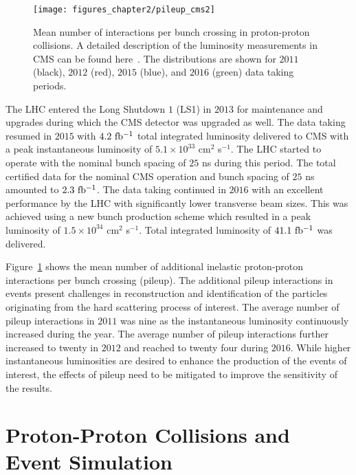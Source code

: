 \begin{figure}[h]
\centering
\texttt{[image: figures\_chapter2/pileup\_cms2]}
\caption{Mean number of interactions per bunch crossing in proton-proton collisions. A detailed description of the  luminosity measurements in CMS can be found here~\cite{CMS-PAS-LUM-13-001,CMS-PAS-LUM-15-001}. The distributions are shown for $2011$ (black), $2012$ (red), $2015$ (blue), and $2016$ (green) data taking periods.}
\label{fig:pu}
\end{figure} 

The LHC entered the Long Shutdown $1$ (LS1) in $2013$ for maintenance and upgrades during which the CMS detector was upgraded as well. The data taking resumed in $2015$ with $4.2~\mathrm{fb^{-1}}$ total integrated luminosity delivered to CMS with a peak instantaneous luminosity of $5.1 \times 10^{33}$ cm$^2$ s$^{-1}$. The LHC started to operate with the nominal bunch spacing of $25$ ns during this period. The total certified data for the nominal CMS operation and bunch spacing of $25$ ns amounted to $2.3~\mathrm{fb^{-1}}$. The data taking continued in $2016$ with an excellent performance by the LHC with significantly lower transverse beam sizes. This was achieved using a new bunch production scheme which resulted in a peak luminosity of  $1.5 \times 10^{34}$ cm$^2$ s$^{-1}$. Total integrated luminosity of $41.1~\mathrm{fb^{-1}}$ was delivered.

Figure~\ref{fig:pu} shows the mean number of additional inelastic proton-proton interactions per bunch crossing (pileup). The additional pileup interactions in events present challenges in reconstruction and identification of the particles originating from the hard scattering process of interest. The average number of pileup interactions in $2011$ was nine as the instantaneous luminosity continuously increased during the year. The average number of pileup interactions further increased to twenty in $2012$ and reached to twenty four during $2016$.  While higher instantaneous luminosities are desired to enhance the production of the events of interest, the effects of pileup need to be mitigated to improve the sensitivity of the results. 

\section{Proton-Proton Collisions and Event Simulation}

